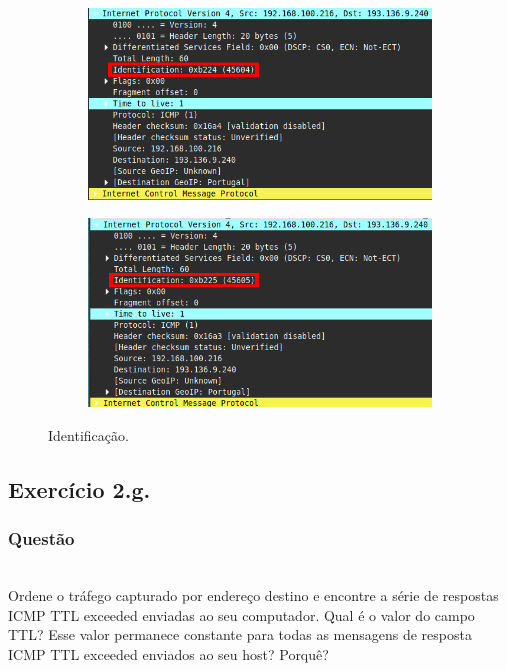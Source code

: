 \documentclass{llncs}
\begin{document}
\begin{figure}[h]
	\centering
	\begin{subfigure}{.5\textwidth}
		\centering
		\includegraphics[width=0.98\linewidth]{./imagens/icmp_1_id.png}
	\end{subfigure}%
	\begin{subfigure}{.5\textwidth}
		\centering
		\includegraphics[width=0.98\linewidth]{./imagens/icmp_2_id.png}
	\end{subfigure}
	\caption{Identificação.}
	\label{fig:field_id}
\end{figure}


\subsection{Exercício 2.g.}
\subsubsection{Questão}\rule[-10pt]{0pt}{10pt}\\

Ordene o tráfego capturado por endereço destino e encontre a série de respostas ICMP TTL exceeded enviadas ao seu computador. Qual é o valor do campo TTL? Esse valor permanece constante para todas as mensagens de resposta ICMP TTL exceeded enviados ao seu host? Porquê? 
\end{document}
